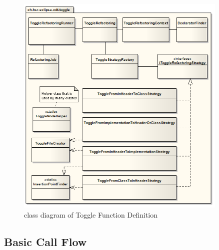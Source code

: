 \begin{figure}[h]
  \centering
  \includegraphics[width=0.9\textwidth]{images/class_diagram.png}
  \caption{class diagram of Toggle Function Definition}
  \label{classdiagram}
\end{figure}

\subsection{Basic Call Flow}

